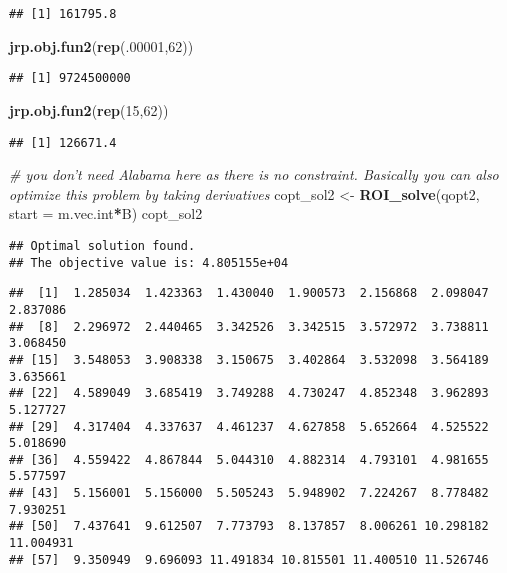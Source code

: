 \documentclass[
]{article}
\newenvironment{Shaded}{\begin{snugshade}}{\end{snugshade}}
\newcommand{\CommentTok}[1]{\textcolor[rgb]{0.56,0.35,0.01}{\textit{#1}}}
\newcommand{\DataTypeTok}[1]{\textcolor[rgb]{0.13,0.29,0.53}{#1}}
\newcommand{\DecValTok}[1]{\textcolor[rgb]{0.00,0.00,0.81}{#1}}
\newcommand{\KeywordTok}[1]{\textcolor[rgb]{0.13,0.29,0.53}{\textbf{#1}}}
\newcommand{\NormalTok}[1]{#1}
\newcommand{\OperatorTok}[1]{\textcolor[rgb]{0.81,0.36,0.00}{\textbf{#1}}}
\newcommand{\StringTok}[1]{\textcolor[rgb]{0.31,0.60,0.02}{#1}}
\begin{document}
\begin{verbatim}
## [1] 161795.8
\end{verbatim}

\begin{Shaded}
\begin{Highlighting}[]
\KeywordTok{jrp.obj.fun2}\NormalTok{(}\KeywordTok{rep}\NormalTok{(.}\DecValTok{00001}\NormalTok{,}\DecValTok{62}\NormalTok{))}
\end{Highlighting}
\end{Shaded}

\begin{verbatim}
## [1] 9724500000
\end{verbatim}

\begin{Shaded}
\begin{Highlighting}[]
\KeywordTok{jrp.obj.fun2}\NormalTok{(}\KeywordTok{rep}\NormalTok{(}\DecValTok{15}\NormalTok{,}\DecValTok{62}\NormalTok{))}
\end{Highlighting}
\end{Shaded}

\begin{verbatim}
## [1] 126671.4
\end{verbatim}

\begin{Shaded}
\begin{Highlighting}[]
\CommentTok{# you don't need Alabama here as there is no constraint. Basically you can also optimize this problem by taking derivatives}
\NormalTok{copt_sol2 <-}\StringTok{ }\KeywordTok{ROI_solve}\NormalTok{(qopt2, }\DataTypeTok{start =}\NormalTok{ m.vec.int}\OperatorTok{*}\NormalTok{B)}
\NormalTok{copt_sol2}
\end{Highlighting}
\end{Shaded}

\begin{verbatim}
## Optimal solution found.
## The objective value is: 4.805155e+04
\end{verbatim}

\begin{Shaded}
\end{Shaded}

\begin{verbatim}
##  [1]  1.285034  1.423363  1.430040  1.900573  2.156868  2.098047  2.837086
##  [8]  2.296972  2.440465  3.342526  3.342515  3.572972  3.738811  3.068450
## [15]  3.548053  3.908338  3.150675  3.402864  3.532098  3.564189  3.635661
## [22]  4.589049  3.685419  3.749288  4.730247  4.852348  3.962893  5.127727
## [29]  4.317404  4.337637  4.461237  4.627858  5.652664  4.525522  5.018690
## [36]  4.559422  4.867844  5.044310  4.882314  4.793101  4.981655  5.577597
## [43]  5.156001  5.156000  5.505243  5.948902  7.224267  8.778482  7.930251
## [50]  7.437641  9.612507  7.773793  8.137857  8.006261 10.298182 11.004931
## [57]  9.350949  9.696093 11.491834 10.815501 11.400510 11.526746
\end{verbatim}
\end{document}
